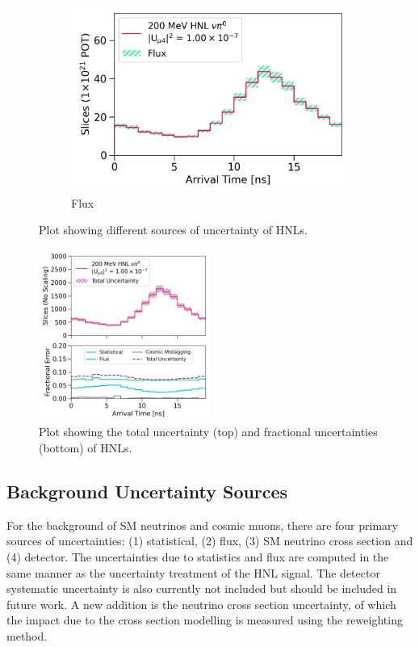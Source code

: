 \begin{figure}[htbp!]
\begin{subfigure}[b]{0.495\textwidth}
            \includegraphics[width=\textwidth]{hnl_flux_error}
            \caption{Flux}%
            \label{fig:hnl_flux}
        \end{subfigure}
        \caption{
	Plot showing different sources of uncertainty of HNLs.
	}
        \label{fig:hnl_error}
	\vspace{0.5cm}
\centering    
\includegraphics[width=0.5\textwidth]{hnl_error}
\caption[hnl_error]{
Plot showing the total uncertainty (top) and fractional uncertainties (bottom) of HNLs.
}
\label{fig:hnl_total_error}
\end{figure}

\subsection{Background Uncertainty Sources}
\label{sec:bkg_error}

For the background of SM neutrinos and cosmic muons, there are four primary sources of uncertainties: (1) statistical, (2) flux, (3) SM neutrino cross section and (4) detector.
The uncertainties due to statistics and flux are computed in the same manner as the uncertainty treatment of the HNL signal.
The detector systematic uncertainty is also currently not included but should be included in future work.
A new addition is the neutrino cross section uncertainty, of which the impact due to the cross section modelling 
is measured using the reweighting method.


